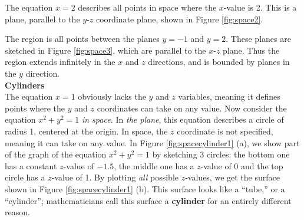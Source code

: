 The equation $x=2$ describes all points in space where the $x$-value is 2. This is a plane, parallel to the $y$-$z$ coordinate plane, shown in Figure \ref{fig:space2}.\\


{The region is all points between the planes $y=-1$ and $y=2$. These planes are sketched in Figure \ref{fig:space3}, which are parallel to the $x$-$z$ plane. Thus the region extends infinitely in the $x$ and $z$ directions, and is bounded by planes in the $y$ direction.
}\\



\noindent\textbf{\large Cylinders}\\

The equation $x=1$ obviously lacks the $y$ and $z$ variables, meaning it defines points where the $y$ and $z$ coordinates can take on any value. Now consider the equation $x^2+y^2=1$ \emph{in space.} In \emph{the plane}, this equation describes a circle of radius 1, centered at the origin. In space, the $z$ coordinate is not specified, meaning it can take on any value. In Figure \ref{fig:spacecylinder1} (a), we show part of the graph of the equation $x^2+y^2=1$ by sketching 3 circles: the bottom one has a constant $z$-value of $-1.5$, the middle one has a $z$-value of 0 and the top circle has a $z$-value of 1. By plotting \emph{all} possible $z$-values, we get the  surface shown in Figure \ref{fig:spacecylinder1} (b). 
This surface looks like a ``tube,'' or a ``cylinder''; mathematicians call this surface a \textbf{cylinder} for an entirely different reason.\\


